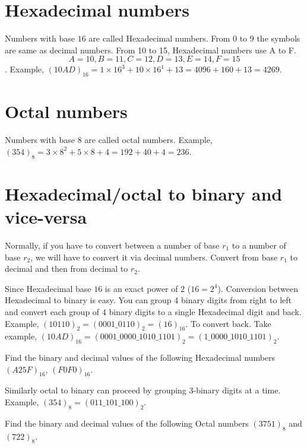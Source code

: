 \section{Hexadecimal numbers}
Numbers with base $16$ are called Hexadecimal numbers. From 0 to 9 the symbols
are same as decimal numbers. From 10 to 15, Hexadecimal numbers use A to F.
\[ A = 10, B = 11, C = 12, D = 13, E = 14, F = 15 \]. Example, $(10AD)_{16} = 1
\times 16^3 + 10 \times 16^1 + 13 = 4096 + 160 + 13 = 4269$.

\section{Octal numbers}
Numbers with base $8$ are called octal numbers. Example, $(354)_8 = 3 \times 8^2
+ 5 \times 8 + 4 = 192 + 40 + 4 = 236$.



\section{Hexadecimal/octal to binary and vice-versa}
Normally, if you have to convert between a number of base $r_1$ to a number of
base $r_2$, we will have to convert it via decimal numbers. Convert from base
$r_1$ to decimal and then from decimal to $r_2$.

Since Hexadecimal base $16$ is an exact power of $2$ ($16 = 2^4$). Conversion
between Hexadecimal to binary is easy. You can group 4 binary digits from right
to left and convert each group of 4 binary digits to a single Hexadecimal digit
and back. Example, $(10110)_2 = (0001\_0110)_2 = (16)_{16}$. To convert back.
Take example, $(10AD)_{16} = (0001\_0000\_1010\_1101)_2 = (1\_0000\_1010\_1101)_2$.

\begin{prob}
  Find the binary and decimal values of the following Hexadecimal numbers
  $(A25F)_{16}$, $(F0F0)_{16}$.
\end{prob}
\vspace{10em}



Similarly octal to binary can proceed by grouping 3-binary digits at a time.
Example, $(354)_8 = (011\_101\_100)_2$.

\begin{prob}
  Find the binary and decimal values of the following Octal numbers
  $(3751)_8$ and $(722)_8$.
\end{prob}
\vspace{10em}
